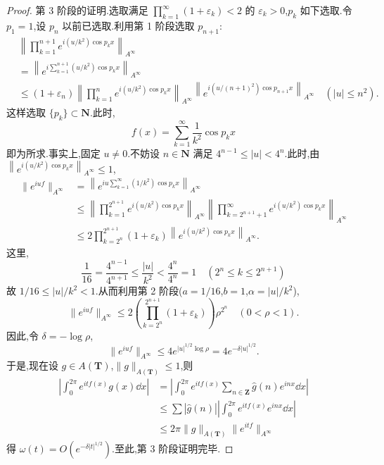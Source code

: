 \begin{proof}
第 3 阶段的证明.选取满足 $\prod_{k=1}^{\infty}(1 + \varepsilon_{k}) < 2$ 的 $\varepsilon_{k} > 0$,$p_{k}$ 如下选取.令 $p_{1} = 1$,设 $p_{n}$ 以前已选取.利用第 1 阶段选取 $p_{n+1}$:
\begin{align*}
& \left\|\prod_{k=1}^{n+1}e^{i(u/k^{2})\cos p_{k}x}\right\|_{A^{\infty}} \\
& = \left\|e^{i\sum_{k=1}^{n+1}(u/k^{2})\cos p_{k}x}\right\|_{A^{\infty}} \\
& \leq (1 + \varepsilon_{n})\left\|\prod_{k=1}^{n}e^{i(u/k^{2})\cos p_{k}x}\right\|_{A^{\infty}}\left\|e^{i(u/(n+1)^{2})\cos p_{n+1}x}\right\|_{A^{\infty}} \quad (|u| \leq n^{2}).
\end{align*}
这样选取 $\{p_{k}\} \subset \mathbf{N}$.此时,
\begin{equation*}
f(x) = \sum_{k=1}^{\infty}\frac{1}{k^{2}}\cos p_{k}x
\end{equation*}
即为所求.事实上,固定 $u \neq 0$.不妨设 $n \in \mathbf{N}$ 满足 $4^{n-1} \leq |u| < 4^{n}$.此时,由 $\left\|e^{i(u/k^{2})\cos p_{k}x}\right\|_{A^{\infty}} \leq 1$,
\begin{align*}
\|e^{iuf}\|_{A^{\infty}} & = \left\|e^{iu\sum_{k=1}^{\infty}(1/k^{2})\cos p_{k}x}\right\|_{A^{\infty}} \\
& \leq \left\|\prod_{k=1}^{2^{n+1}}e^{i(u/k^{2})\cos p_{k}x}\right\|_{A^{\infty}}\left\|\prod_{k=2^{n+1}+1}^{\infty}e^{i(u/k^{2})\cos p_{k}x}\right\|_{A^{\infty}} \\
& \leq 2\prod_{k=2^{n}}^{2^{n+1}}(1 + \varepsilon_{k})\left\|e^{i(u/k^{2})\cos p_{k}x}\right\|_{A^{\infty}}.
\end{align*}
这里,
\begin{equation*}
\frac{1}{16} = \frac{4^{n-1}}{4^{n+1}} \leq \frac{|u|}{k^{2}} < \frac{4^{n}}{4^{n}} = 1 \quad (2^{n} \leq k \leq 2^{n+1})
\end{equation*}
故 $1/16 \leq |u|/k^{2} < 1$.从而利用第 2 阶段($a = 1/16$,$b = 1$,$\alpha = |u|/k^{2}$),
\begin{equation*}
\|e^{iuf}\|_{A^{\infty}} \leq 2\left(\prod_{k=2^{n}}^{2^{n+1}}(1 + \varepsilon_{k})\right)\rho^{2^{n}} \quad (0 < \rho < 1).
\end{equation*}
因此,令 $\delta = -\log\rho$,
\begin{equation*}
\|e^{iuf}\|_{A^{\infty}} \leq 4e^{|u|^{1/2}\log\rho} = 4e^{-\delta|u|^{1/2}}.
\end{equation*}
于是,现在设 $g \in A(\mathbf{T})$,$\|g\|_{A(\mathbf{T})} \leq 1$,则
\begin{align*}
\left|\int_{0}^{2\pi}e^{itf(x)}g(x)\dd x\right| & = \left|\int_{0}^{2\pi}e^{itf(x)}\sum_{n \in \mathbf{Z}}\hat{g}(n)e^{inx}\dd x\right| \\
& \leq \sum|\hat{g}(n)|\left|\int_{0}^{2\pi}e^{itf(x)}e^{inx}\dd x\right| \\
& \leq 2\pi\|g\|_{A(\mathbf{T})}\|e^{itf}\|_{A^{\infty}}
\end{align*}
得 $\omega(t) = O\left(e^{-\delta|t|^{1/2}}\right)$.至此,第 3 阶段证明完毕.
\end{proof}

